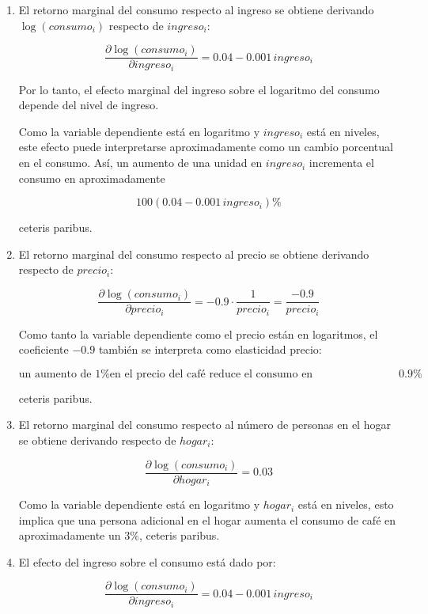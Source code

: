 \documentclass[12pt]{article}
\begin{document}
\begin{enumerate}
    \item[a)] El retorno marginal del consumo respecto al ingreso se obtiene derivando $\log(consumo_i)$ respecto de $ingreso_i$:

    \[
    \frac{\partial \log(consumo_i)}{\partial ingreso_i}
    = 0.04 - 0.001\,ingreso_i
    \]

    Por lo tanto, el efecto marginal del ingreso sobre el logaritmo del consumo depende del nivel de ingreso.

    Como la variable dependiente está en logaritmo y $ingreso_i$ está en niveles, este efecto puede interpretarse aproximadamente como un cambio porcentual en el consumo. Así, un aumento de una unidad en $ingreso_i$ incrementa el consumo en aproximadamente

    \[
    100(0.04 - 0.001\,ingreso_i)\%
    \]

    ceteris paribus.

    \item[b)] El retorno marginal del consumo respecto al precio se obtiene derivando respecto de $precio_i$:

    \[
    \frac{\partial \log(consumo_i)}{\partial precio_i}
    = -0.9 \cdot \frac{1}{precio_i}
    = \frac{-0.9}{precio_i}
    \]

    Como tanto la variable dependiente como el precio están en logaritmos, el coeficiente $-0.9$ también se interpreta como elasticidad precio:

    \[
    \text{un aumento de 1\% en el precio del café reduce el consumo en aproximadamente } 0.9\%
    \]

    ceteris paribus.

    \item[c)] El retorno marginal del consumo respecto al número de personas en el hogar se obtiene derivando respecto de $hogar_i$:

    \[
    \frac{\partial \log(consumo_i)}{\partial hogar_i} = 0.03
    \]

    Como la variable dependiente está en logaritmo y $hogar_i$ está en niveles, esto implica que una persona adicional en el hogar aumenta el consumo de café en aproximadamente un $3\%$, ceteris paribus.

    \item[d)] El efecto del ingreso sobre el consumo está dado por:

    \[
    \frac{\partial \log(consumo_i)}{\partial ingreso_i}
    = 0.04 - 0.001\,ingreso_i
    \]


\end{enumerate}
\end{document}
